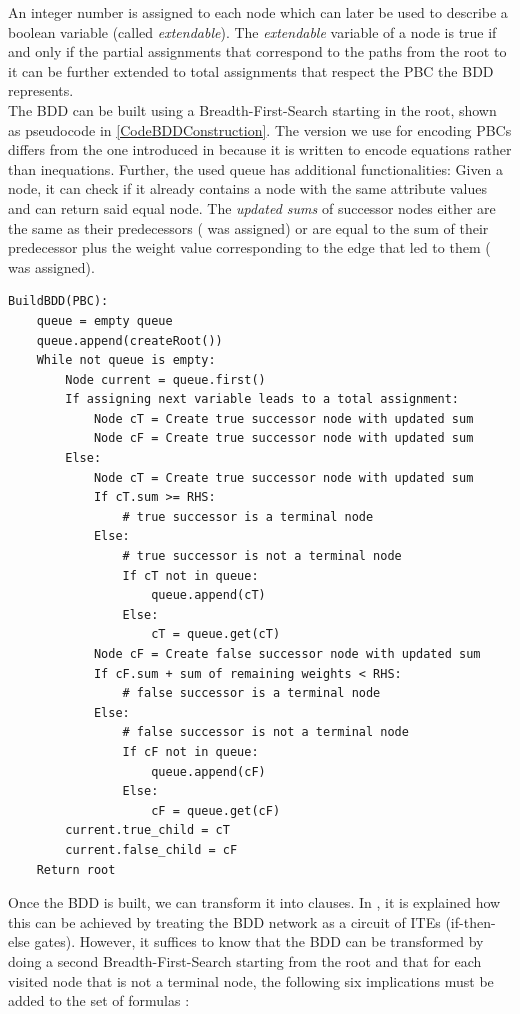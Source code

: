 An integer number is assigned to each node which can later be used to describe a boolean variable (called \emph{extendable}). The  \emph{extendable} variable of a node is true if and only if the partial assignments that correspond to the paths from the root to it can be further extended to total assignments that respect the PBC the BDD represents.\\

The BDD can be built using a Breadth-First-Search starting in the root, shown as pseudocode in \ref{CodeBDDConstruction}. The version we use for encoding PBCs differs from the one introduced in \cite{Een2006TranslatingPC} because it is written to encode equations rather than inequations. Further, the used queue has additional functionalities: Given a node, it can check if it already contains a node with the same attribute values and can return said equal node. The \emph{updated sums} of successor nodes either are the same as their predecessors (\false{} was assigned) or are equal to the sum of their predecessor plus the weight value corresponding to the edge that led to them (\true{} was assigned).
\newpage
{
\pseudo{}
\renewcommand{\lstlistingname}{Algorithm}
\begin{lstlisting}[frame=single,caption={Pseudo Code of BDD construction},captionpos=b, label=CodeBDDConstruction, basicstyle=\footnotesize]
BuildBDD(PBC):
    queue = empty queue
    queue.append(createRoot())
    While not queue is empty:
        Node current = queue.first()
        If assigning next variable leads to a total assignment:
            Node cT = Create true successor node with updated sum
            Node cF = Create true successor node with updated sum
        Else:
            Node cT = Create true successor node with updated sum
            If cT.sum >= RHS:
                # true successor is a terminal node
            Else:
                # true successor is not a terminal node
                If cT not in queue:
                    queue.append(cT)
                Else:
                    cT = queue.get(cT)
            Node cF = Create false successor node with updated sum
            If cF.sum + sum of remaining weights < RHS:
                # false successor is a terminal node
            Else:
                # false successor is not a terminal node
                If cF not in queue:
                    queue.append(cF)
                Else:
                    cF = queue.get(cF)
        current.true_child = cT
        current.false_child = cF
    Return root
\end{lstlisting}
}
\newpage
Once the BDD is built, we can transform it into clauses. In \cite{Een2006TranslatingPC}, it is explained how this can be achieved by treating the BDD network as a circuit of ITEs (if-then-else gates). However, it suffices to know that the BDD can be transformed by doing a second Breadth-First-Search starting from the root and that for each visited node that is not a terminal node, the following six implications must be added to the set of formulas \cite{Een2006TranslatingPC}:

